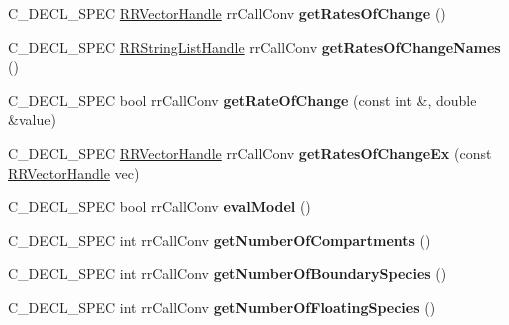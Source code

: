 \begin{DoxyCompactItemize}
\item 
\hypertarget{group__loadsave_gabbe129bee63761f7b0f98f060b86067b}{
\-C\-\_\-\-D\-E\-C\-L\-\_\-\-S\-P\-E\-C \hyperlink{struct_r_r_vector}{\-R\-R\-Vector\-Handle} \*
rr\-Call\-Conv {\bfseries get\-Rates\-Of\-Change} ()}
\label{group__loadsave_gabbe129bee63761f7b0f98f060b86067b}

\item 
\hypertarget{group__loadsave_gaf9d5b185617519ceff1a018d9009c0fd}{
\-C\-\_\-\-D\-E\-C\-L\-\_\-\-S\-P\-E\-C \hyperlink{struct_r_r_string_list}{\-R\-R\-String\-List\-Handle} \*
rr\-Call\-Conv {\bfseries get\-Rates\-Of\-Change\-Names} ()}
\label{group__loadsave_gaf9d5b185617519ceff1a018d9009c0fd}

\item 
\hypertarget{group__loadsave_gaad38321993112e230f7fccd96345de6c}{
\-C\-\_\-\-D\-E\-C\-L\-\_\-\-S\-P\-E\-C bool rr\-Call\-Conv {\bfseries get\-Rate\-Of\-Change} (const int \&, double \&value)}
\label{group__loadsave_gaad38321993112e230f7fccd96345de6c}

\item 
\hypertarget{group__loadsave_gacfae48e32754e7678b8bb003df93ef53}{
\-C\-\_\-\-D\-E\-C\-L\-\_\-\-S\-P\-E\-C \hyperlink{struct_r_r_vector}{\-R\-R\-Vector\-Handle} \*
rr\-Call\-Conv {\bfseries get\-Rates\-Of\-Change\-Ex} (const \hyperlink{struct_r_r_vector}{\-R\-R\-Vector\-Handle} vec)}
\label{group__loadsave_gacfae48e32754e7678b8bb003df93ef53}

\item 
\hypertarget{group__loadsave_ga3fbb7c2fab261f25a3871f1caf398ff1}{
\-C\-\_\-\-D\-E\-C\-L\-\_\-\-S\-P\-E\-C bool rr\-Call\-Conv {\bfseries eval\-Model} ()}
\label{group__loadsave_ga3fbb7c2fab261f25a3871f1caf398ff1}

\item 
\hypertarget{group__loadsave_ga5ea2479b882549edd4fb75397ca38f52}{
\-C\-\_\-\-D\-E\-C\-L\-\_\-\-S\-P\-E\-C int rr\-Call\-Conv {\bfseries get\-Number\-Of\-Compartments} ()}
\label{group__loadsave_ga5ea2479b882549edd4fb75397ca38f52}

\item 
\hypertarget{group__loadsave_ga17c851dfb27b9697ff286cc57d4cd10d}{
\-C\-\_\-\-D\-E\-C\-L\-\_\-\-S\-P\-E\-C int rr\-Call\-Conv {\bfseries get\-Number\-Of\-Boundary\-Species} ()}
\label{group__loadsave_ga17c851dfb27b9697ff286cc57d4cd10d}

\item 
\hypertarget{group__loadsave_ga9a96b81c58073caff01ea2c9e0f5e119}{
\-C\-\_\-\-D\-E\-C\-L\-\_\-\-S\-P\-E\-C int rr\-Call\-Conv {\bfseries get\-Number\-Of\-Floating\-Species} ()}
\label{group__loadsave_ga9a96b81c58073caff01ea2c9e0f5e119}


\end{DoxyCompactItemize}
